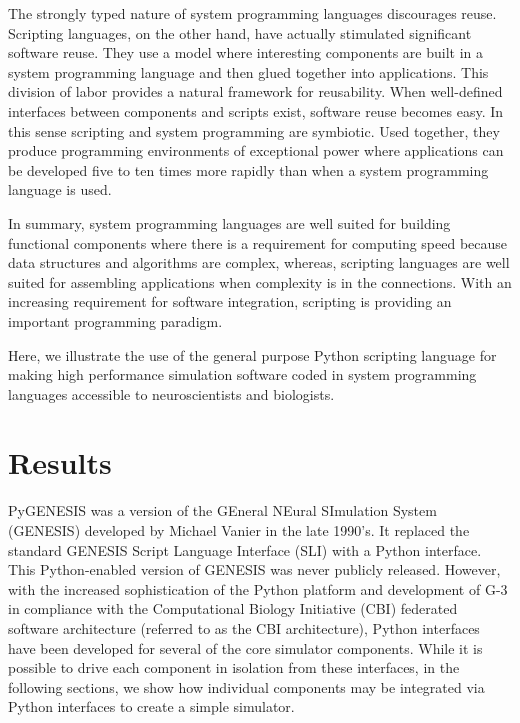 \documentclass[10pt]{article}
\begin{document}
The strongly typed nature of system programming languages discourages
reuse. Scripting languages, on the other hand, have actually
stimulated significant software reuse. They use a model where
interesting components are built in a system programming language and
then glued together into applications.
This division of labor provides a natural framework for reusability.
When well-defined interfaces between components and scripts exist, software reuse becomes easy.
In this sense scripting and system programming are symbiotic. Used together, they produce programming environments of exceptional power where applications can be developed
five to ten times more rapidly than when a system programming language is used.

In summary, system programming languages are well suited for building functional
components where there is a requirement for computing speed because data structures and
algorithms are complex, whereas, scripting languages are well suited for assembling
applications when complexity is in the connections. With an
increasing requirement for software integration, scripting is
providing an important programming paradigm.

Here, we illustrate the use of the general purpose Python scripting
language for making high performance simulation software coded in
system programming languages accessible to neuroscientists and
biologists.

\section*{Results}

PyGENESIS was a version of the GEneral NEural SImulation System (GENESIS) developed by Michael Vanier in the late 1990's. It replaced the standard GENESIS Script Language Interface (SLI) with a
Python interface. This Python-enabled version of GENESIS was never
publicly released.  However, with the increased sophistication of the Python
platform and development of G-3 in compliance with the Computational Biology Initiative (CBI) federated software architecture (referred to as the CBI architecture), Python interfaces have been developed for several of the core
simulator components.  While it is possible to drive each
component in isolation from these interfaces, in the following sections, we
show how individual components may be integrated via Python interfaces to create a simple simulator.
\end{document}
